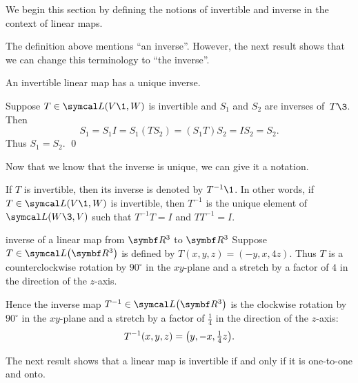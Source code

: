We begin this section by defining the notions of invertible and inverse in the context of linear maps.


The definition above mentions ``an inverse''\!. However, the next result shows that we can change this terminology to ``the inverse''\!.

{An invertible linear map has a unique inverse.}

\proof
Suppose $T \in \L(V\1,W)$ is invertible and $S_1$ and $S_2$ are inverses of~$T\3$. Then
\[
S_1 = S_1I = S_1(TS_2) = (S_1T)S_2 = IS_2 = S_2.
\]
Thus $S_1 = S_2$. \qed

Now that we know that the inverse is unique, we can give it a notation.

{If $T$ is invertible, then its inverse is denoted by $T^{-1}\1$. In other words, if \mbox{$T \in \L(V\1,W)$} is invertible, then $T^{-1}$ is the unique element of $\L(W\3,V)$ such
that $T^{-1}T = I$ and $TT^{-1} = I$.}

\begin{example}{inverse of a linear map from\/ $\R3$ to\/ $\R3$}
Suppose $T \in \L\paren[\big]{ \R3 }$ is defined by
$
T(x, y, z) = (-y, x, 4z)$.
Thus $T$ is a counterclockwise rotation by $90^\circ$ in the $xy$-plane and a stretch by a factor of $4$ in the direction of the $z$-axis.

Hence the inverse map $T^{-1} \in \L\paren[\big]{ \R3 }$ is the clockwise rotation by $90^\circ$ in the $xy$-plane and a stretch by a factor of $\frac{1}{4}$ in the direction of the $z$-axis:
\[
T^{-1}(x, y, z) = \paren[\big]{y, -x, \tfrac{1}{4}z }.
\]
\exampledisplayend
\end{example}

The next result shows that a linear map is invertible if and only if it is one-to-one and onto.

